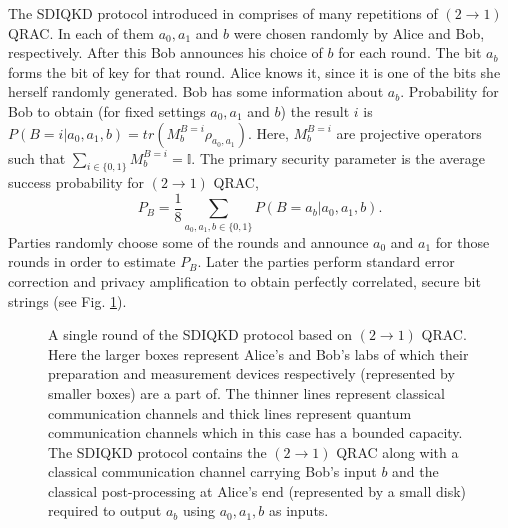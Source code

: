 \documentclass[smallextended]{svjour3}
\begin{document}
The SDIQKD protocol introduced in \cite{pawlowski2011semi} comprises of many repetitions of $(2\to 1)$ QRAC. In each of them $a_0,a_1$ and $b$ were chosen randomly by Alice and Bob, respectively. After this Bob announces his choice of $b$ for each round. The bit $a_b$ forms the bit of key for that round. Alice knows it, since it is one of the bits she herself randomly generated. Bob has some information about $a_b$. Probability for Bob to obtain (for fixed settings $a_0,a_1$ and $b$) the result $i$ is $P(B=i|a_0,a_1,b)=tr(M_{b}^{B=i}\rho_{a_0,a_1})$. Here, $M_{b}^{B=i}$ are projective operators such that $\sum_{i\in\{0,1\}}{M_{b}^{B=i}}=\mathbb{I}$. The primary security parameter is the average success probability for $(2\to1)$ QRAC,
\begin{equation}
P_B=\frac{1}{8}\sum_{a_0,a_1,b\in\{0,1\}}{P(B=a_b|a_0,a_1,b)}.
\end{equation}
Parties randomly choose some of the rounds and announce $a_0$ and $a_1$ for those rounds in order to estimate $P_B$. Later the parties perform standard error correction and privacy amplification to obtain perfectly correlated, secure bit strings (see Fig. \ref{21}).

\begin{figure}[htp]
\centering
{}
\caption{A single round of the SDIQKD protocol based on $(2\to 1)$ QRAC. Here the larger boxes represent Alice's and Bob's labs of which their preparation and measurement devices respectively (represented by smaller boxes) are a part of. The thinner lines represent classical communication channels and thick lines represent quantum communication channels which in this case has a bounded capacity. The SDIQKD protocol contains the $(2\to1)$ QRAC along with a classical communication channel carrying Bob's input $b$ and the classical post-processing at Alice's end (represented by a small disk) required to output $a_b$ using $a_0,a_1,b$ as inputs.}
\label{21}
\end{figure}
\end{document}
